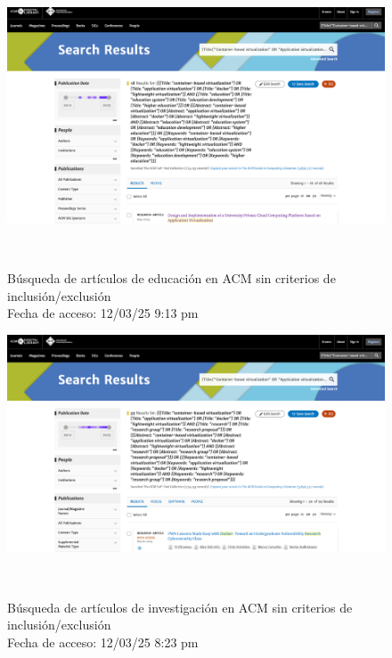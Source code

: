 \begin{figure}[H]
    \centering
    \includegraphics[width=\textwidth,keepaspectratio]{apendices/BD/sin-criterios/ACM-ed.png}
    \caption{Búsqueda de artículos de educación en ACM sin criterios de inclusión/exclusión \\
    Fecha de acceso: 12/03/25 9:13 pm
    }\
\end{figure}
\FloatBarrier\begin{figure}[H]
    \centering
    \includegraphics[width=\textwidth,keepaspectratio]{apendices/BD/sin-criterios/ACM-inv.png}
    \caption{Búsqueda de artículos de investigación en ACM sin criterios de inclusión/exclusión \\
    Fecha de acceso: 12/03/25 8:23 pm
    }\
\end{figure}
